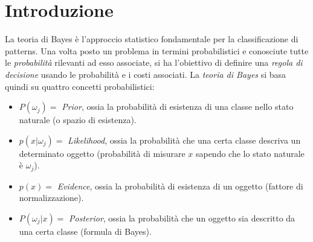 \documentclass[a4paper,oneside,titlepage]{book}
\begin{document}
\section{Introduzione}
La teoria di Bayes è l'approccio statistico fondamentale per la classificazione di patterns. Una volta posto un problema in termini probabilistici e conosciute tutte le \textit{probabilità} rilevanti ad esso associate, si ha l'obiettivo di definire una \textit{regola di decisione} usando le probabilità e i costi associati. La \textit{teoria di Bayes} si basa quindi su quattro concetti probabilistici:
\begin{itemize}
    \item $P(\omega_j) =$ \textit{Prior}, ossia la probabilità di esistenza di una classe nello stato naturale (o spazio di esistenza).
    \item $p(x|\omega_j) =$ \textit{Likelihood}, ossia la probabilità che una certa classe descriva un determinato oggetto (probabilità di misurare $x$ sapendo che lo stato naturale è $\omega_j$).
    \item $p(x) =$ \textit{Evidence}, ossia la probabilità di esistenza di un oggetto (fattore di normalizzazione).
    \item $P(\omega_j|x) =$ \textit{Posterior}, ossia la probabilità che un oggetto sia descritto da una certa classe (formula di Bayes).
\end{itemize}
\end{document}
